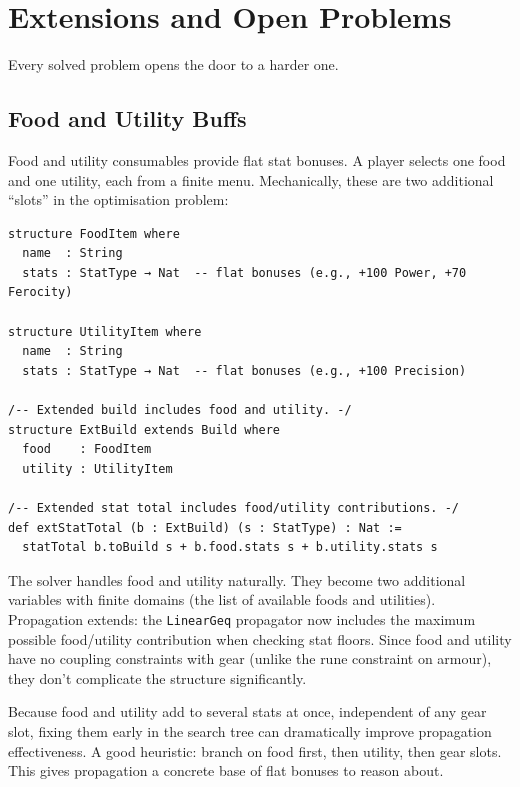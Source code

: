 \documentclass[11pt, a4paper, oneside]{book}
\begin{document}
\chapter{Extensions and Open Problems}
\label{ch:extensions}

\epigraph{Every solved problem opens the door to a harder one.}{}

\section{Food and Utility Buffs}

Food and utility consumables provide flat stat bonuses.  A player selects
one food and one utility, each from a finite menu.  Mechanically, these are
two additional ``slots'' in the optimisation problem:

\begin{leanbox}[title={Lean 4 --- Modelling Food and Utility}]
\begin{verbatim}
structure FoodItem where
  name  : String
  stats : StatType → Nat  -- flat bonuses (e.g., +100 Power, +70 Ferocity)

structure UtilityItem where
  name  : String
  stats : StatType → Nat  -- flat bonuses (e.g., +100 Precision)

/-- Extended build includes food and utility. -/
structure ExtBuild extends Build where
  food    : FoodItem
  utility : UtilityItem

/-- Extended stat total includes food/utility contributions. -/
def extStatTotal (b : ExtBuild) (s : StatType) : Nat :=
  statTotal b.toBuild s + b.food.stats s + b.utility.stats s
\end{verbatim}
\end{leanbox}

The solver handles food and utility naturally.  They become two additional
variables with finite domains (the list of available foods and utilities).
Propagation extends: the \texttt{LinearGeq} propagator now includes the
maximum possible food/utility contribution when checking stat floors.  Since
food and utility have no coupling constraints with gear (unlike the rune
constraint on armour), they don't complicate the structure significantly.

\begin{intuitionbox}
Because food and utility add to several stats at once, independent of any
gear slot, fixing them
early in the search tree can dramatically improve propagation effectiveness.
A good heuristic: branch on food first, then utility, then gear slots.
This gives propagation a concrete base of flat bonuses to reason about.
\end{intuitionbox}
\end{document}
